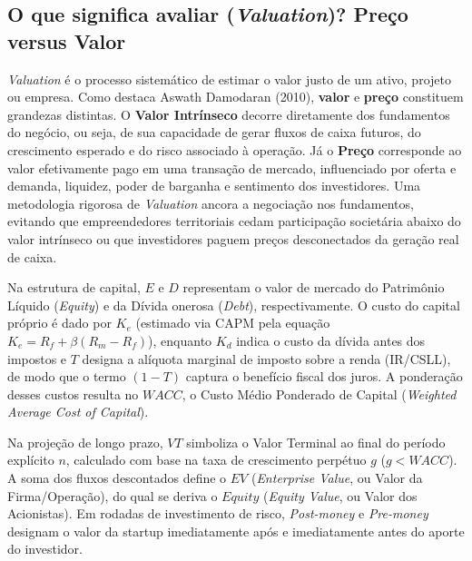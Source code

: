 
\subsection{O que significa avaliar (\textit{Valuation})? Preço versus Valor}

\textit{Valuation} é o processo sistemático de estimar o valor justo de um ativo, projeto ou empresa. Como destaca Aswath Damodaran (2010), \textbf{valor} e \textbf{preço} constituem grandezas distintas. O \textbf{Valor Intrínseco} decorre diretamente dos fundamentos do negócio, ou seja, de sua capacidade de gerar fluxos de caixa futuros, do crescimento esperado e do risco associado à operação. Já o \textbf{Preço} corresponde ao valor efetivamente pago em uma transação de mercado, influenciado por oferta e demanda, liquidez, poder de barganha e sentimento dos investidores. Uma metodologia rigorosa de \textit{Valuation} ancora a negociação nos fundamentos, evitando que empreendedores territoriais cedam participação societária abaixo do valor intrínseco ou que investidores paguem preços desconectados da geração real de caixa.

\begin{boxSimbolo}
Na estrutura de capital, $E$ e $D$ representam o valor de mercado do Patrimônio Líquido (\textit{Equity}) e da Dívida onerosa (\textit{Debt}), respectivamente. O custo do capital próprio é dado por $K_e$ (estimado via CAPM pela equação $K_e = R_f + \beta(R_m - R_f)$), enquanto $K_d$ indica o custo da dívida antes dos impostos e $T$ designa a alíquota marginal de imposto sobre a renda (IR/CSLL), de modo que o termo $(1-T)$ captura o benefício fiscal dos juros. A ponderação desses custos resulta no $WACC$, o Custo Médio Ponderado de Capital (\textit{Weighted Average Cost of Capital}).

Na projeção de longo prazo, $VT$ simboliza o Valor Terminal ao final do período explícito $n$, calculado com base na taxa de crescimento perpétuo $g$ ($g < WACC$). A soma dos fluxos descontados define o $EV$ (\textit{Enterprise Value}, ou Valor da Firma/Operação), do qual se deriva o $Equity$ (\textit{Equity Value}, ou Valor dos Acionistas). Em rodadas de investimento de risco, \textit{Post-money} e \textit{Pre-money} designam o valor da startup imediatamente após e imediatamente antes do aporte do investidor.
\end{boxSimbolo}

